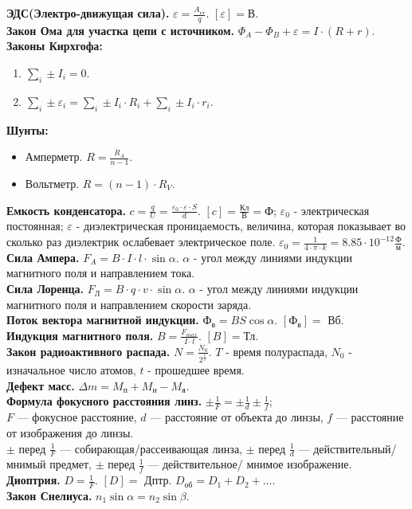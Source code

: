 \documentclass[12pt]{article}
\begin{document}
	\textbf{ЭДС(Электро-движущая сила).} $\varepsilon = \frac{A_{\text{ст}}}{q}$. $[\varepsilon] = \text{В}$.\\
	\textbf{Закон Ома для участка цепи с источником.} $\Phi_{A} - \Phi_{B} + \varepsilon = I \cdot (R + r)$.\\
	\textbf{Законы Кирхгофа:}
	\begin{enumerate}
		\item $\sum \limits_{i} \pm I_{i} = 0$.
		\item $\sum \limits_{i} \pm \varepsilon_{i} = \sum \limits_{i} \pm I_{i} \cdot R_{i} + \sum \limits_{i} \pm I_{i} \cdot r_{i}$.
	\end{enumerate}
	\textbf{Шунты:}
	\begin{itemize}
		\item Амперметр. $R = \frac{R_{A}}{n - 1}$.
		\item Вольтметр. $R = (n - 1) \cdot R_{V}$.
	\end{itemize}
	\textbf{Емкость конденсатора.} $c = \frac{q}{U} = \frac{\varepsilon_{0} \cdot \varepsilon \cdot S}{d}$. $[c] = \frac{\text{Кл}}{\text{В}} = \text{Ф}$; $\varepsilon_{0}$ - электрическая постоянная; $\varepsilon$ - диэлектрическая проницаемость, величина, которая показывает во сколько раз диэлектрик ослабевает электрическое поле. $\varepsilon_{0} = \frac{1}{4 \cdot \pi \cdot k} = 8.85 \cdot 10^{-12} \frac{\text{Ф}}{\text{м}}$.\\
	\textbf{Сила Ампера.} $F_{A} = B \cdot I \cdot l \cdot \sin\alpha$. $\alpha$ - угол между линиями индукции магнитного поля и направлением тока.\\
	\textbf{Сила Лоренца.} $F_{\text{Л}} = B \cdot q \cdot v \cdot \sin\alpha$. $\alpha$ - угол между линиями индукции магнитного поля и направлением скорости заряда.\\
	\textbf{Поток вектора магнитной индукции.} $\text{Ф}_{\text{в}} = BS \cos\alpha$. $[\text{Ф}_{\text{в}}] =$ Вб.\\
	\textbf{Индукция магнитного поля.} $B = \frac{F_{max}}{I \cdot l}$. $[B] = \text{Тл}$.\\
	\textbf{Закон радиоактивного распада.} $N = \frac{N_{0}}{2^{\frac{t}{T}}}$. $T$ - время полураспада, $N_{0}$ - изначальное число атомов, $t$ - прошедшее время.\\
	\textbf{Дефект масс.} $\varDelta m = M_{\text{п}} + M_{\text{н}} - M_{\text{я}}$.\\
	\textbf{Формула фокусного расстояния линз.} $\pm \frac{1}{F} = \pm \frac{1}{d} \pm \frac{1}{f}$;\\
	$F$ --- фокусное расстояние, $d$ --- расстояние от объекта до линзы, $f$ --- расстояние от изображения до линзы.\\
	$\pm$ перед $\frac{1}{F}$ --- собирающая/рассеивающая линза, $\pm$ перед $\frac{1}{d}$ --- действительный/мнимый предмет, $\pm$ перед $\frac{1}{f}$ --- действительное/ мнимое изображение.\\
	\textbf{Диоптрия.} $D = \frac{1}{F}$. $[D] =$ Дптр. $D_{\text{об}} = D_1 + D_2 + \dots$.\\
	\textbf{Закон Снелиуса.} $n_1 \sin\alpha = n_2 \sin\beta$.
	
\end{document}
